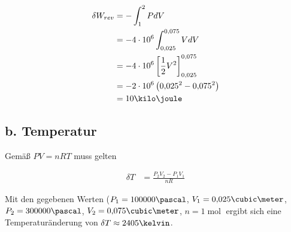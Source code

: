 \documentclass[a4paper,german,12pt,smallheadings]{scrartcl}
\begin{document}
\begin{align*}
  \delta W_{rev} &= -\int_1^2 PdV \\
                 &= -4 \cdot 10^6 \int_{0{,}025}^{0{,}075} V dV \\
                 &= -4 \cdot 10^6 \left[\frac{1}{2}V^2\right]_{0{,}025}^{0{,}075} \\
                 &= -2 \cdot 10^6 \left(0{,}025^2-0{,}075^2\right) \\
                 &= 10 \kilo\joule
\end{align*}

\subsection*{b. Temperatur}

Gemäß $PV = nRT$ muss gelten

\begin{align*}
  \delta T &= \frac{P_2V_2 - P_1V_1}{nR}
\end{align*}

Mit den gegebenen Werten ($P_1 = 100000 \pascal$, $V_1 = 0{,}025 \cubic\meter$,
$P_2 = 300000 \pascal$, $V_2 = 0{,}075 \cubic\meter$, $n = 1 \operatorname{mol}$ ergibt sich
eine Temperaturänderung von $\delta T \approx 2405 \kelvin$.
\end{document}
